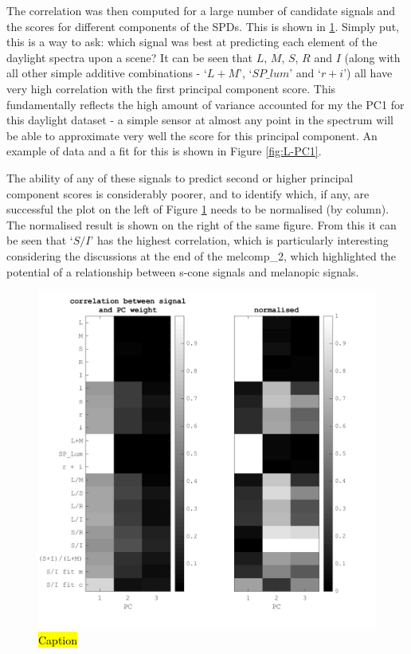 
The correlation was then computed for a large number of candidate signals and the scores for different components of the \glspl{SPD}. This is shown in \ref{fig:19}. Simply put, this is a way to ask: which signal was best at predicting each element of the daylight spectra upon a scene? It can be seen that $L$, $M$, $S$, $R$ and $I$ (along with all other simple additive combinations - `$L+M$', `$SP\_lum$' and `$r+i$') all have very high correlation with the first principal component score. This fundamentally reflects the high amount of variance accounted for my the \gls{PC1} for this daylight dataset - a simple sensor at almost any point in the spectrum will be able to approximate very well the score for this principal component. An example of data and a fit for this is shown in Figure \ref{fig:L-PC1}.

The ability of any of these signals to predict second or higher principal component scores is considerably poorer, and to identify which, if any, are successful the plot on the left of Figure \ref{fig:19} needs to be normalised (by column). The normalised result is shown on the right of the same figure. From this it can be seen that `$S/I$' has the highest correlation, which is particularly interesting considering the discussions at the end of the melcomp\_2, which highlighted the potential of a relationship between s-cone signals and melanopic signals.

\begin{figure}[htbp]
 \includegraphics[max width=\textwidth]{figs/comp/melcomp_3/19.png}
 \caption{\hl{Caption}}
 \label{fig:19}
\end{figure} 

